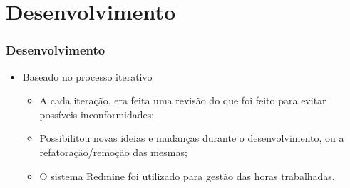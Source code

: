 \section{Desenvolvimento}

\begin{frame}
\frametitle{Desenvolvimento}
	\begin{itemize}
		\item Baseado no processo iterativo
		\begin{itemize}
			\item A cada iteração, era feita uma revisão do que foi feito para evitar possíveis inconformidades;
			\item Possibilitou novas ideias e mudanças durante o desenvolvimento, ou a refatoração/remoção das mesmas;
			\item O sistema Redmine foi utilizado para gestão das horas trabalhadas. 
		\end{itemize}
	\end{itemize}
\end{frame}